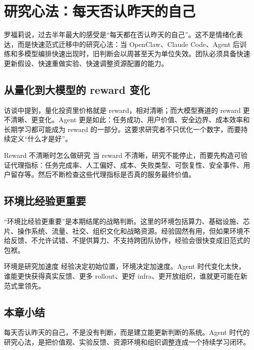 \section{研究心法：每天否认昨天的自己}

罗福莉说，过去半年最大的感受是“每天都在否认昨天的自己”。这不是情绪化表达，而是快速范式迁移中的研究心法：当 OpenClaw、Claude Code、Agent 后训练和多模型编排快速出现时，旧判断会以周甚至天为单位失效。团队必须具备快速更新假设、快速重做实验、快速调整资源配置的能力。

\subsection{从量化到大模型的 reward 变化}

访谈中提到，量化投资里价格就是 reward，相对清晰；而大模型赛道的 reward 更不清晰、更变化。Agent 更是如此：任务成功、用户价值、安全边界、成本效率和长期学习都可能成为 reward 的一部分。这要求研究者不只优化一个数字，而要持续定义“什么才是好”。

\begin{knowledgebox}{Reward 不清晰时怎么做研究}
当 reward 不清晰，研究不能停止，而要先构造可验证代理指标：任务完成率、人工偏好、成本、失败类型、可恢复性、安全事件、用户留存等。然后不断检查这些代理指标是否真的服务最终价值。
\end{knowledgebox}

\subsection{环境比经验更重要}

“环境比经验更重要”是本期结尾的战略判断。这里的环境包括算力、基础设施、芯片、操作系统、流量、社交、组织文化和战略资源。经验固然有用，但如果环境不给反馈、不允许试错、不提供算力、不支持跨团队协作，经验会很快变成旧范式的包袱。

\begin{importantbox}{环境是研究加速度}
经验决定初始位置，环境决定加速度。Agent 时代变化太快，谁能更快获得真实反馈、更多 rollout、更好 infra、更开放组织，谁就更可能在新范式里领先。
\end{importantbox}

\subsection{本章小结}

每天否认昨天的自己，不是没有判断，而是建立能更新判断的系统。Agent 时代的研究心法，是把价值观、实验反馈、资源环境和组织调整连成一个持续学习闭环。

